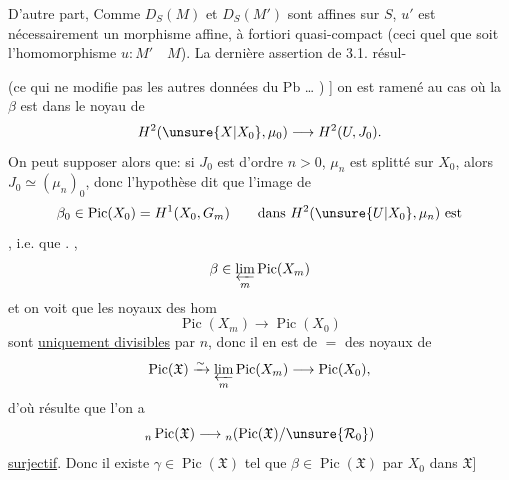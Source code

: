 D'autre part, Comme $D_S(M)$ et $D_S(M')$ sont affines sur $S$,
$u'$ est nécessairement un morphisme affine, à fortiori quasi-compact
(ceci quel que soit l'homomorphisme $u:M'\quad M$). La dernière assertion
de 3.1. résul-

(ce qui ne modifie pas les autres données du Pb \ldots
{}) ]
on est ramené au cas où la  $\beta$ est dans le noyau de
\[
 H^2(\unsure{X|X_0},\mu_0)\longrightarrow H^2(U,J_0).
\]
On peut supposer alors que: si $J_0$ est d'ordre $n>0$,
$\mu_n$ est splitté sur $X_0$, alors $J_0\simeq(\mu_n)_0$, donc
l'hypothèse dit que l'image de \deleted{$\unsure{\beta}$}
\[
 \beta_0\in\operatorname{Pic}(X_0)=H^1(X_0,G_m)
 \qquad\text{dans }H^2(\unsure{U|X_0},\mu_n)\text{ est}
\]
, i.e. que
.
 , 
\[
 \beta\in\varprojlim_m\operatorname{Pic}(X_m)
\]
et on voit que les noyaux des hom
\[
 \operatorname{Pic}(X_m)\longrightarrow\operatorname{Pic}(X_0)
\]
sont  \uline{uniquement divisibles} par $n$,
donc il en est de $=$ des noyaux de
\[
 \operatorname{Pic}(\mathfrak X)\xrightarrow{\sim}
 \varprojlim_m\operatorname{Pic}(X_m)\longrightarrow\operatorname{Pic}(X_0),
\]
d'où résulte que l'on a
\[
 {}_n\operatorname{Pic}(\mathfrak X)\longrightarrow
 {}_n(\operatorname{Pic}(\mathfrak X)/\unsure{\mathcal R_0})
\]
\uline{surjectif}. Donc il existe $\gamma\in\operatorname{Pic}(\mathfrak X)$
tel que
$\beta\in\operatorname{Pic}(\mathfrak X)$
 par $X_0$ dans $\mathfrak X$]
